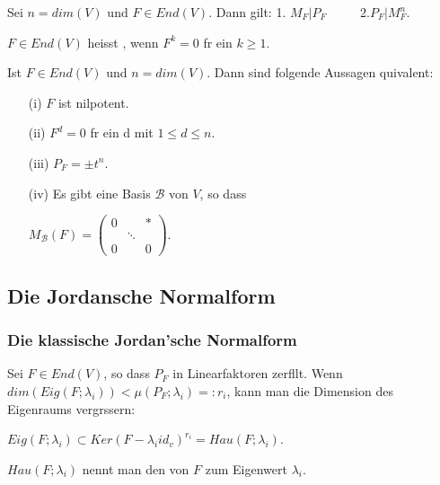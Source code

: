 \documentclass[8pt, a4paper, twocolumn, landscape]{article}
\begin{document}
\begin{theorem}
Sei $n = dim (V)$ und $F \in End(V)$. Dann gilt:
1. $M_F | P_F$ $\qquad$ 2.$P_F | M_F^n$.
\end{theorem}
\begin{definition}
$F \in End(V)$ heisst , wenn $F^k = 0$ f\uee r ein $k \geq 1$.
\end{definition}
\begin{theorem}
Ist $F \in End(V)$ und $n = dim(V)$. Dann sind folgende Aussagen \aee quivalent:
\begin{itemize}
\item[(i)] $F$ ist nilpotent.
\item[(ii)] $F^d = 0$ f\uee r ein d mit $1 \leq d \leq n$.
\item[(iii)] $P_F = \pm t^n$.
\item[(iv)] Es gibt eine Basis $\mathcal{B}$ von $V$, so dass 
\\ \centerline{
$M_{\mathcal{B}}(F)=\left(\begin{array}{ccc}
{0} & {} & {*} \\ {} & {\ddots} & {} 
\\ {0} & {} & {0}\end{array}\right)$.
}
\end{itemize}
\end{theorem}

\subsection{Die Jordansche Normalform}
\subsubsection{Die klassische Jordan'sche Normalform}
\begin{definition}
Sei $F \in End(V)$, so dass $P_F$ in Linearfaktoren zerf\aee llt. Wenn $dim(Eig(F; \lambda_i)) < \mu (P_F; \lambda_i) =: r_i$, kann man die Dimension des Eigenraums vergr\oee ssern: 
\\ \centerline{$Eig(F; \lambda_i) \subset Ker(F - \lambda_i id_v)^{r_i} = Hau(F; \lambda_i)$. }
$Hau(F; \lambda_i)$ nennt man den  von $F$ zum Eigenwert $\lambda_i$.
\end{definition}
\end{document}
